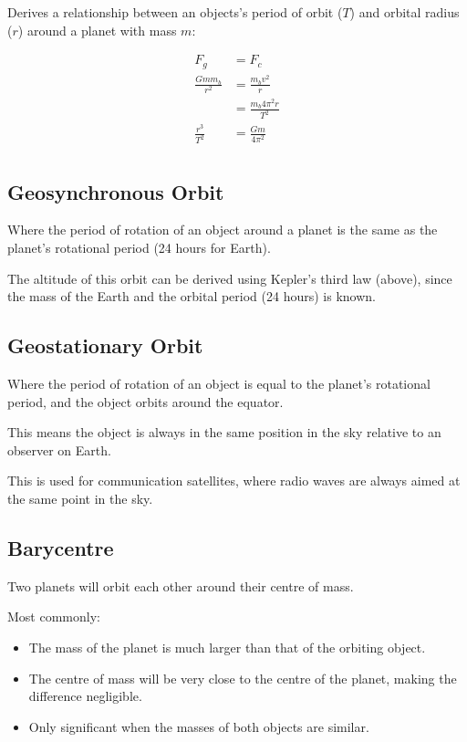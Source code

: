 \documentclass[a4paper,11pt]{article}
\begin{document}
Derives a relationship between an objects's period of orbit ($T$) and orbital
radius ($r$) around a planet with mass $m$:

$$
\begin{aligned}
F_g & = F_c \\
\frac{G m m_b}{r^2} & = \frac{m_b v^2}{r} \\
& = \frac{m_b 4 \pi^2 r}{T^2} \\
\frac{r^3}{T^2} & = \frac{G m}{4 \pi^2} \\
\end{aligned}
$$


\subsection{Geosynchronous Orbit}

Where the period of rotation of an object around a planet is the same as the
planet's rotational period (24 hours for Earth).

The altitude of this orbit can be derived using Kepler's third law (above),
since the mass of the Earth and the orbital period (24 hours) is known.


\subsection{Geostationary Orbit}

Where the period of rotation of an object is equal to the planet's rotational
period, and the object orbits around the equator.

This means the object is always in the same position in the sky relative to an
observer on Earth.

This is used for communication satellites, where radio waves are always aimed
at the same point in the sky.


\subsection{Barycentre}

Two planets will orbit each other around their centre of mass.

Most commonly:

\begin{itemize}
\item The mass of the planet is much larger than that of the orbiting object.
\item The centre of mass will be very close to the centre of the planet, making
	the difference negligible.
\item Only significant when the masses of both objects are similar.
\end{itemize}
\end{document}
